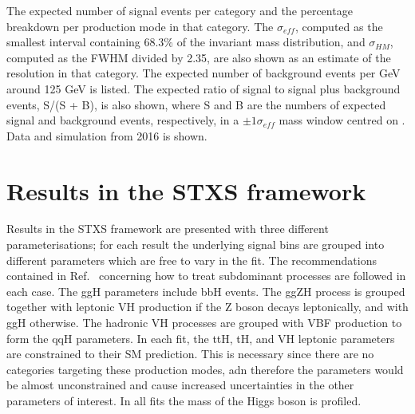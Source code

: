 {\begin{landscape}
  \begin{table}
    \resizebox{1.5\textwidth}{!}{}
    \caption{
      The expected number of signal events per category and
      the percentage breakdown per production mode in that category. 
      The $\sigma_{eff}$, computed as the smallest interval containing 68.3\% 
      of the invariant mass distribution, and $\sigma_{HM}$, computed as the FWHM divided by 2.35,
      are also shown as an estimate of the \mgg resolution in that category.
      The expected number of background events per GeV around 125 GeV is listed.
      The expected ratio of signal to signal plus background events, S/(S + B), is also shown,
      where S and B are the numbers of expected signal and background events, respectively, 
      in a $\pm 1 \sigma_{eff}$ mass window centred on \mH.
      Data and simulation from 2016 is shown.}
    \label{tab:results_yields2017}
  \end{table}
\end{landscape}

\section{Results in the STXS framework}

Results in the STXS framework are presented with three different parameterisations;
for each result the underlying signal bins 
are grouped into different parameters which are free to vary in the fit.
The recommendations contained in Ref.~\cite{YR4} 
concerning how to treat subdominant processes are followed in each case.
The ggH parameters include bbH events.
The ggZH process is grouped together with leptonic VH production if the Z boson decays leptonically, 
and with ggH otherwise.
The hadronic VH processes are grouped with VBF production to form the qqH parameters.
In each fit, the ttH, tH, and VH leptonic parameters are constrained to their SM prediction. 
This is necessary since there are no categories targeting these production modes, 
adn therefore the parameters would be almost unconstrained 
and cause increased uncertainties in the other parameters of interest.
In all fits the mass of the Higgs boson is profiled.

}
